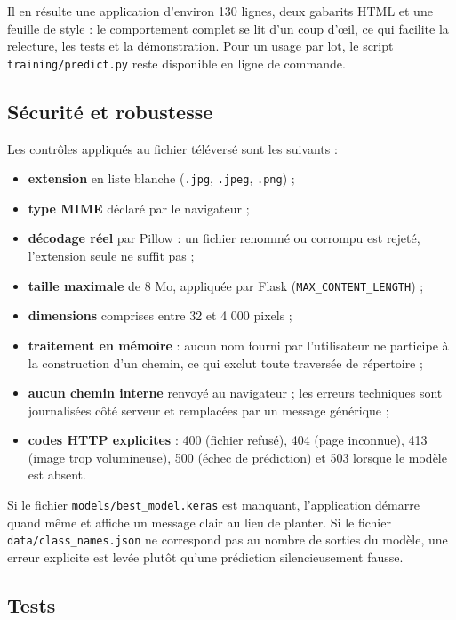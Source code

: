 \documentclass[10pt,a4paper]{article}
\begin{document}
Il en résulte une application d'environ 130 lignes, deux gabarits HTML et une feuille de style : le comportement complet se lit d'un coup d'œil, ce qui facilite la relecture, les tests et la démonstration. Pour un usage par lot, le script \texttt{training/\allowbreak{}predict.py} reste disponible en ligne de commande.

\subsection{Sécurité et robustesse}

Les contrôles appliqués au fichier téléversé sont les suivants :

\begin{itemize}
\item \textbf{extension} en liste blanche (\texttt{.jpg}, \texttt{.jpeg}, \texttt{.png}) ;
\item \textbf{type MIME} déclaré par le navigateur ;
\item \textbf{décodage réel} par Pillow : un fichier renommé ou corrompu est rejeté, l'extension seule ne suffit pas ;
\item \textbf{taille maximale} de 8 Mo, appliquée par Flask (\texttt{MAX\_\allowbreak{}CONTENT\_\allowbreak{}LENGTH}) ;
\item \textbf{dimensions} comprises entre 32 et 4 000 pixels ;
\item \textbf{traitement en mémoire} : aucun nom fourni par l'utilisateur ne participe à la construction d'un chemin, ce qui exclut toute traversée de répertoire ;
\item \textbf{aucun chemin interne} renvoyé au navigateur ; les erreurs techniques sont journalisées côté serveur et remplacées par un message générique ;
\item \textbf{codes HTTP explicites} : 400 (fichier refusé), 404 (page inconnue), 413 (image trop volumineuse), 500 (échec de prédiction) et 503 lorsque le modèle est absent.
\end{itemize}

Si le fichier \texttt{models/\allowbreak{}best\_\allowbreak{}model.keras} est manquant, l'application démarre quand même et affiche un message clair au lieu de planter. Si le fichier \texttt{data/\allowbreak{}class\_\allowbreak{}names.json} ne correspond pas au nombre de sorties du modèle, une erreur explicite est levée plutôt qu'une prédiction silencieusement fausse.

\subsection{Tests}
\end{document}
